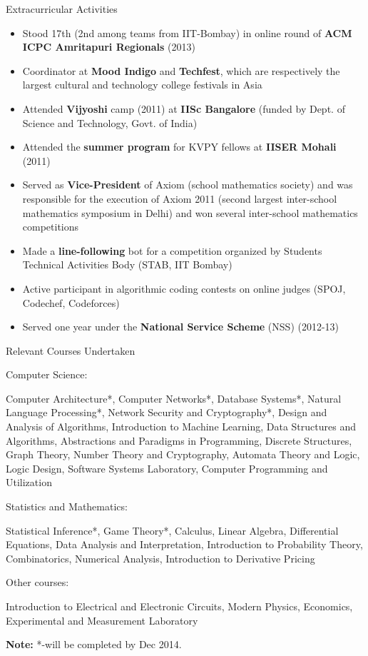 \documentclass{resume2} %
\begin{document}
\begin{rSection}{Extracurricular Activities}
\begin{itemize}[leftmargin=*]
\item Stood 17th (2nd among teams from IIT-Bombay) in online round of \textbf{ACM ICPC Amritapuri Regionals} (2013)
\item Coordinator at \textbf{Mood Indigo} and \textbf{Techfest}, which are respectively the largest cultural and technology college festivals in Asia 
\item Attended \textbf{Vijyoshi} camp (2011) at \textbf{IISc Bangalore} (funded by Dept. of Science and Technology, Govt. of India)
\item Attended the \textbf{summer program} for KVPY fellows at \textbf{IISER Mohali} (2011)
\item Served as \textbf{Vice-President} of Axiom (school mathematics society) and was responsible for the execution of Axiom 2011 (second largest inter-school mathematics symposium in Delhi) and won several inter-school mathematics competitions
\item Made a \textbf{line-following} bot for a competition organized by Students Technical Activities Body (STAB, IIT Bombay)
\item Active participant in algorithmic coding contests on online judges (SPOJ, Codechef, Codeforces)
\item Served one year under the \textbf{National Service Scheme} (NSS) (2012-13)
\end{itemize}
\end{rSection}

\begin{rSection}{Relevant Courses Undertaken}
\begin{rSubsection}{Computer Science:}{}{}{}
\item Computer Architecture*, Computer Networks*, Database Systems*, Natural Language Processing*, Network Security and Cryptography*, Design and Analysis of Algorithms, Introduction to Machine Learning, Data Structures and Algorithms, Abstractions and
Paradigms in Programming, Discrete Structures, Graph Theory, Number Theory and Cryptography, Automata Theory and Logic, Logic
Design, Software Systems Laboratory, Computer Programming and Utilization

\end{rSubsection}

\begin{rSubsection}{Statistics and Mathematics:}{}{}{}
\item Statistical Inference*, Game Theory*, Calculus, Linear Algebra, Differential Equations, Data Analysis and Interpretation, Introduction to Probability Theory, Combinatorics, Numerical Analysis, Introduction to Derivative Pricing
\end{rSubsection}

\begin{rSubsection}{Other courses:}{}{}{}
\item Introduction to Electrical and Electronic Circuits, Modern Physics, Economics, Experimental and Measurement Laboratory
\end{rSubsection}

\textbf{Note:} *-will be completed by Dec 2014.
\end{rSection}
\end{document}
